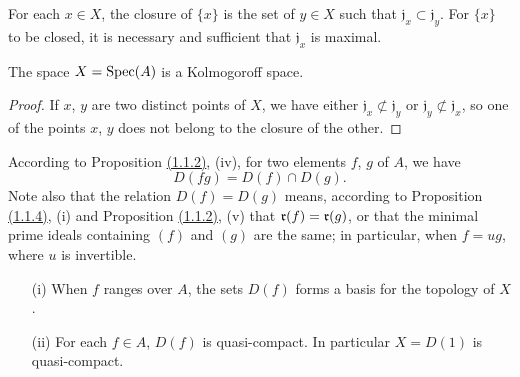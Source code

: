 \begin{cor}[1.1.7]
\label{cor-1.1.1.7}
For each $x\in X$, the closure of $\{x\}$ is the set of $y\in X$ such that
$\mathfrak{j}_x\subset\mathfrak{j}_y$. For $\{x\}$ to be closed, it is necessary and
sufficient that $\mathfrak{j}_x$ is maximal.
\end{cor}

\begin{cor}[1.1.8]
\label{cor-1.1.1.8}
The space $X={\mathop{\mathrm{Spec}}\nolimits}(A)$ is a Kolmogoroff space.
\end{cor}

\begin{proof}
\label{proof-cor-1.1.1.8}
If $x$, $y$ are two distinct points of $X$, we have either
$\mathfrak{j}_x\not\subset\mathfrak{j}_y$ or $\mathfrak{j}_y\not\subset\mathfrak{j}_x$, so
one of the points $x$, $y$ does not belong to the closure of the other.
\end{proof}

\begin{env}[1.1.9]
\label{env-1.1.1.9}
According to Proposition \hyperref[prop-1.1.1.2]{(1.1.2)}, (iv), for two elements $f$, $g$ of $A$, we have
\[
  D(fg)=D(f)\cap D(g).
  \tag{1.1.9.1}
\]
Note also that the relation $D(f)=D(g)$ means, according to Proposition
\hyperref[prop-1.1.1.4]{(1.1.4)}, (i) and Proposition \hyperref[prop-1.1.1.2]{(1.1.2)}, (v) that $\mathfrak{r}(f)=\mathfrak{r}(g)$, or
that the minimal prime ideals containing $(f)$ and $(g)$ are the same; in particular, when
$f=ug$, where $u$ is invertible.
\end{env}

\begin{prop}[1.1.10]
\label{prop-1.1.1.10}
\medskip\noindent
{}
\begin{itemize}
  \item[{\rm(i)}] When $f$ ranges over $A$, the sets $D(f)$ forms a basis for the topology of $X$.
  \item[{\rm(ii)}] For each $f\in A$, $D(f)$ is quasi-compact. In particular $X=D(1)$ is quasi-compact.
\end{itemize}
\end{prop}

